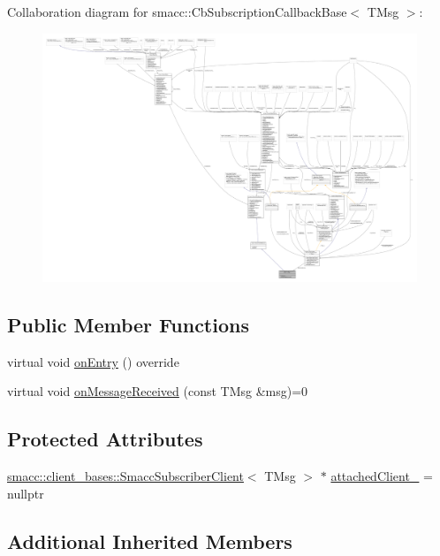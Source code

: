 Collaboration diagram for smacc\+:\+:Cb\+Subscription\+Callback\+Base$<$ T\+Msg $>$\+:
\nopagebreak
\begin{figure}[H]
\begin{center}
\leavevmode
\includegraphics[width=350pt]{classsmacc_1_1CbSubscriptionCallbackBase__coll__graph}
\end{center}
\end{figure}
\subsection*{Public Member Functions}
\begin{DoxyCompactItemize}
\item 
virtual void \hyperlink{classsmacc_1_1CbSubscriptionCallbackBase_a1092b6c0d6fd428be86939559bed1e16}{on\+Entry} () override
\item 
virtual void \hyperlink{classsmacc_1_1CbSubscriptionCallbackBase_a77d8d3eee701b990277e69804eac0049}{on\+Message\+Received} (const T\+Msg \&msg)=0
\end{DoxyCompactItemize}
\subsection*{Protected Attributes}
\begin{DoxyCompactItemize}
\item 
\hyperlink{classsmacc_1_1client__bases_1_1SmaccSubscriberClient}{smacc\+::client\+\_\+bases\+::\+Smacc\+Subscriber\+Client}$<$ T\+Msg $>$ $\ast$ \hyperlink{classsmacc_1_1CbSubscriptionCallbackBase_af6f6d8dd53447934d90d6d71bdcc10cb}{attached\+Client\+\_\+} = nullptr
\end{DoxyCompactItemize}
\subsection*{Additional Inherited Members}


